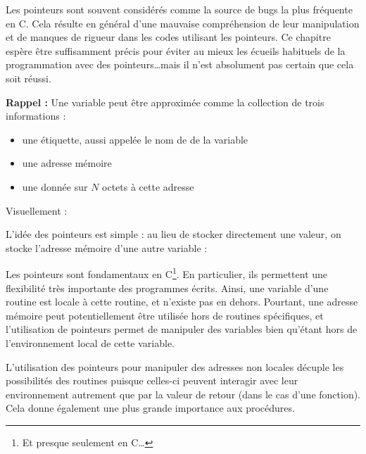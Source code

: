 \documentclass[../../../main.tex]{subfiles}
\begin{document}
Les pointeurs sont souvent considérés comme la source de bugs la plus fréquente en C. Cela résulte en général d'une mauvaise compréhension de leur manipulation et de manques de rigueur dans les codes utilisant les pointeurs.
Ce chapitre espère être suffisamment précis pour éviter au mieux les écueils habituels de la programmation avec des pointeurs\dots mais il n'est absolument pas certain que cela soit réussi.
 
\textbf{Rappel :} Une variable peut être approximée comme la collection de trois informations :
\begin{itemize}
	\item une étiquette, aussi appelée le nom de de la variable
	\item une adresse mémoire
	\item une donnée sur $N$ octets à cette adresse
\end{itemize}
Visuellement : 

\begin{minipage}{\textwidth}
	\begin{center}
		
	\end{center}
\end{minipage} 

L'idée des pointeurs est simple : au lieu de stocker directement une valeur, on stocke l'adresse mémoire d'une autre variable :

\begin{minipage}{\textwidth}
	\begin{center}
		
	\end{center}
\end{minipage}
 
Les pointeurs sont fondamentaux en C\footnote{Et presque seulement en C\dots}. En particulier, ils permettent une flexibilité très importante des programmes écrits. Ainsi, une variable d'une routine est locale à cette routine, et n'existe pas en dehors. Pourtant, une adresse mémoire peut potentiellement être utilisée hors de routines spécifiques, et l'utilisation de pointeurs permet de manipuler des variables bien qu'étant hors de l'environnement local de cette variable.

L'utilisation des pointeurs pour manipuler des adresses non locales décuple les possibilités des routines puisque celles-ci peuvent interagir avec leur environnement autrement que par la valeur de retour (dans le cas d'une fonction). Cela donne également une plus grande importance aux procédures.
\end{document}
